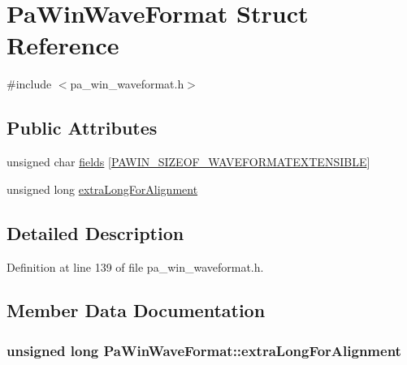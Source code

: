 \hypertarget{struct_pa_win_wave_format}{}\section{Pa\+Win\+Wave\+Format Struct Reference}
\label{struct_pa_win_wave_format}


{\ttfamily \#include $<$pa\+\_\+win\+\_\+waveformat.\+h$>$}

\subsection*{Public Attributes}
\begin{DoxyCompactItemize}
\item 
unsigned char \hyperlink{struct_pa_win_wave_format_a1857b636da839476d43d6ee1220b273b}{fields} \mbox{[}\hyperlink{pa__win__waveformat_8h_a18f598724b0ca16bd3d3f12af864cfdc}{P\+A\+W\+I\+N\+\_\+\+S\+I\+Z\+E\+O\+F\+\_\+\+W\+A\+V\+E\+F\+O\+R\+M\+A\+T\+E\+X\+T\+E\+N\+S\+I\+B\+LE}\mbox{]}
\item 
unsigned long \hyperlink{struct_pa_win_wave_format_a2749d19cc78ddc3ced94da57e75c87ce}{extra\+Long\+For\+Alignment}
\end{DoxyCompactItemize}


\subsection{Detailed Description}


Definition at line 139 of file pa\+\_\+win\+\_\+waveformat.\+h.



\subsection{Member Data Documentation}
\subsubsection[{\texorpdfstring{extra\+Long\+For\+Alignment}{extraLongForAlignment}}]{\setlength{\rightskip}{0pt plus 5cm}unsigned long Pa\+Win\+Wave\+Format\+::extra\+Long\+For\+Alignment}\hypertarget{struct_pa_win_wave_format_a2749d19cc78ddc3ced94da57e75c87ce}{}\label{struct_pa_win_wave_format_a2749d19cc78ddc3ced94da57e75c87ce}


